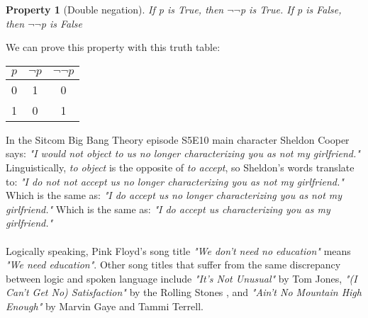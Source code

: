 \documentclass[10pt,a4paper,draft,titlepage,onecolumn]{book}
\newtheorem{property}{Property}[section]
\begin{document}
\begin{property}[Double negation] If p is True, then {$\neg$}{$\neg$}p is True. If p is False, then {$\neg$}$\neg$p is False
\end{property}
We can prove this property with this truth table:
\begin{center}
\begin{tabular}{ |c| c|c| }
 \hline
 $p$ & {$\neg$}$p$ & {$\neg$}{$\neg$}$p$  \\
 \hline
 0 & 1 & 0 \\ 
 1 & 0 & 1\\
 \hline
\end{tabular}
\end{center}
In the Sitcom Big Bang Theory episode S5E10 main character Sheldon Cooper says: \textit{"I would not object to us no longer characterizing you as not my girlfriend."} Linguistically, \textit{to object }is the opposite of \textit{to accept}, so Sheldon's words translate to: \textit{"I do not not accept us no longer characterizing you as not my girlfriend."} 
Which is the same as: \textit{"I do accept us no longer characterizing you as not my girlfriend."} 
Which is the same as: \textit{"I do accept us characterizing you as my girlfriend."}\\\\
Logically speaking, Pink Floyd's song title \textit{"We don't need no education"} means \textit{"We need education"}. Other song titles that suffer from the same discrepancy between logic and spoken language include \textit{"It’s Not Unusual" }by Tom Jones, \textit{"(I Can’t Get No) Satisfaction" }by the Rolling Stones
, and \textit{"Ain’t No Mountain High Enough" }by Marvin Gaye and Tammi Terrell.
\end{document}

